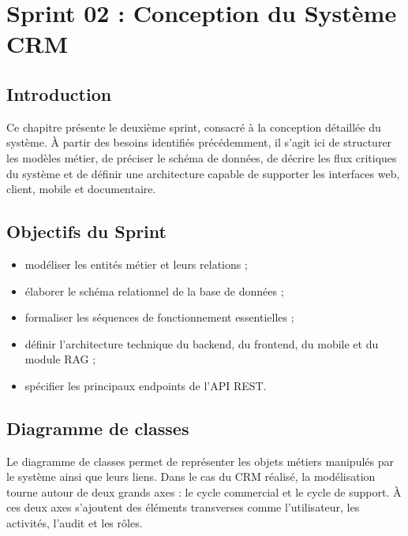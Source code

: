 \chapter{Sprint 02 : Conception du Système CRM}
\minitoc
\newpage

\section{Introduction}
Ce chapitre présente le deuxième sprint, consacré à la conception détaillée du système. À partir des besoins identifiés précédemment, il s'agit ici de structurer les modèles métier, de préciser le schéma de données, de décrire les flux critiques du système et de définir une architecture capable de supporter les interfaces web, client, mobile et documentaire.

\section{Objectifs du Sprint}
\begin{itemize}
    \item modéliser les entités métier et leurs relations ;
    \item élaborer le schéma relationnel de la base de données ;
    \item formaliser les séquences de fonctionnement essentielles ;
    \item définir l'architecture technique du backend, du frontend, du mobile et du module RAG ;
    \item spécifier les principaux endpoints de l'API REST.
\end{itemize}

\section{Diagramme de classes}
Le diagramme de classes permet de représenter les objets métiers manipulés par le système ainsi que leurs liens. Dans le cas du CRM réalisé, la modélisation tourne autour de deux grands axes : le cycle commercial et le cycle de support. À ces deux axes s'ajoutent des éléments transverses comme l'utilisateur, les activités, l'audit et les rôles.

